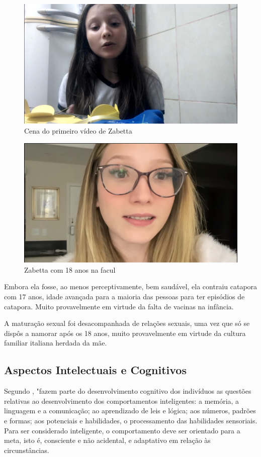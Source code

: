 \begin{figure}[h!]
    \centering
    \includegraphics[width=0.7\linewidth]{fig/Zabetta-13-anos-primeiro-video}
    \caption{Cena do primeiro vídeo de Zabetta}
    \label{fig:zabetta-13-anos-primeiro-video}
\end{figure}

\begin{figure}[h!]
    \centering
    \includegraphics[width=0.7\linewidth]{fig/Zabetta-18-anos-facul}
    \caption{Zabetta com 18 anos na facul}
    \label{fig:zabetta-18-anos-facul}
\end{figure}


Embora ela fosse, ao menos perceptivamente, bem saudável, ela contraiu catapora com 17 anos, idade avançada para a maioria das pessoas para ter episódios de catapora. Muito provavelmente em virtude da falta de vacinas na infância.

A maturação sexual foi desacompanhada de relações sexuais, uma vez que só se dispôs a namorar após os 18 anos, muito provavelmente em virtude da cultura familiar italiana herdada da mãe.



\subsection{Aspectos Intelectuais e Cognitivos}

Segundo , "fazem parte do desenvolvimento cognitivo dos indivíduos as questões relativas ao desenvolvimento dos comportamentos inteligentes: a memória, a linguagem e a comunicação; ao aprendizado de leis e lógica; aos números, padrões e formas; aos potenciais e habilidades, o processamento das habilidades sensoriais. Para ser considerado inteligente, o comportamento deve ser orientado para a meta, isto é, consciente e não acidental, e adaptativo em relação às circunstâncias.

